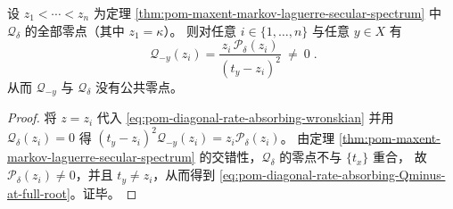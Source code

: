 \begin{corollary}[全谱零点处的删点值评估]\label{cor:pom-diagonal-rate-absorbing-evaluate-at-full-roots}
设 \(z_1<\cdots<z_n\) 为定理 \ref{thm:pom-maxent-markov-laguerre-secular-spectrum} 中 \(\mathcal Q_\delta\) 的全部零点（其中 \(z_1=\kappa\)）。
则对任意 \(i\in\{1,\dots,n\}\) 与任意 \(y\in X\) 有
\begin{equation}\label{eq:pom-diagonal-rate-absorbing-Qminus-at-full-root}
\boxed{\;
\mathcal Q_{-y}(z_i)=\frac{z_i\,\mathcal P_\delta(z_i)}{(t_y-z_i)^2}\ \ne\ 0\; } .
\end{equation}
从而 \(\mathcal Q_{-y}\) 与 \(\mathcal Q_\delta\) 没有公共零点。
\end{corollary}
\begin{proof}
将 \(z=z_i\) 代入 \eqref{eq:pom-diagonal-rate-absorbing-wronskian} 并用 \(\mathcal Q_\delta(z_i)=0\) 得
\(
(t_y-z_i)^2\mathcal Q_{-y}(z_i)=z_i\mathcal P_\delta(z_i)
\)。
由定理 \ref{thm:pom-maxent-markov-laguerre-secular-spectrum} 的交错性，\(\mathcal Q_\delta\) 的零点不与 \(\{t_x\}\) 重合，
故 \(\mathcal P_\delta(z_i)\ne 0\)，并且 \(t_y\ne z_i\)，从而得到 \eqref{eq:pom-diagonal-rate-absorbing-Qminus-at-full-root}。证毕。
\end{proof}

